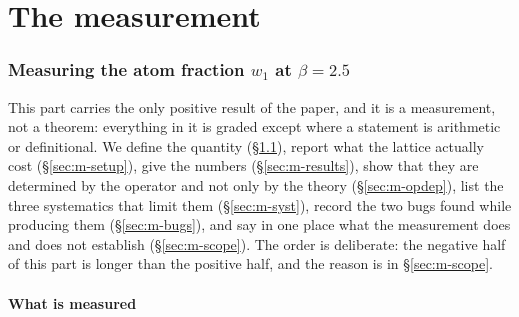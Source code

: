 
\clearpage
\part{The measurement}


\section{Measuring the atom fraction \texorpdfstring{$w_1$}{w1} at \texorpdfstring{$\beta=2.5$}{beta=2.5}}
\label{sec:measurement}

This part carries the only positive result of the paper, and it is a measurement, not a theorem:
everything in it is graded \LE{} except where a statement is arithmetic or definitional. We define
the quantity (\S\ref{sec:m-what}), report what the lattice actually cost (\S\ref{sec:m-setup}),
give the numbers (\S\ref{sec:m-results}), show that they are determined by the operator and not only
by the theory (\S\ref{sec:m-opdep}), list the three systematics that limit them (\S\ref{sec:m-syst}),
record the two bugs found while producing them (\S\ref{sec:m-bugs}), and say in one place what the
measurement does and does not establish (\S\ref{sec:m-scope}). The order is deliberate: the negative
half of this part is longer than the positive half, and the reason is in \S\ref{sec:m-scope}.

\subsection{What is measured}
\label{sec:m-what}

